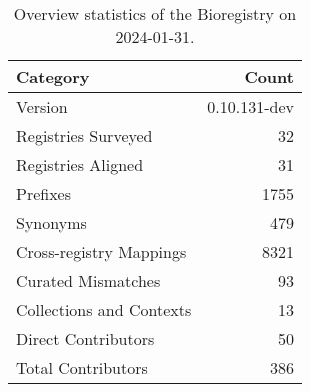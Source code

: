 \begin{table}
\caption{Overview statistics of the Bioregistry on 2024-01-31.}
\label{tab:bioregistry-summary}
\begin{tabular}{lr}
\toprule
Category & Count \\
\midrule
Version & 0.10.131-dev \\
Registries Surveyed & 32 \\
Registries Aligned & 31 \\
Prefixes & 1755 \\
Synonyms & 479 \\
Cross-registry Mappings & 8321 \\
Curated Mismatches & 93 \\
Collections and Contexts & 13 \\
Direct Contributors & 50 \\
Total Contributors & 386 \\
\bottomrule
\end{tabular}
\end{table}
